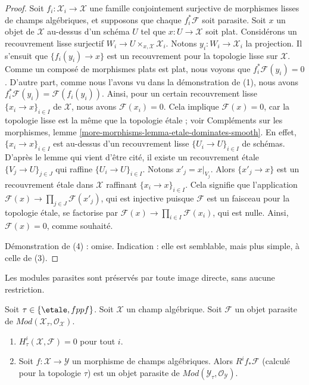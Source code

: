 \begin{proof}
\medskip\noindent
Soit $f_i : \mathcal{X}_i \to \mathcal{X}$ une famille conjointement surjective de
morphismes lisses de champs algébriques, et supposons que chaque $f_i^*\mathcal{F}$
soit parasite. Soit $x$ un objet de $\mathcal{X}$ au-dessus d'un
schéma $U$ tel que $x : U \to \mathcal{X}$ soit plat. Considérons un recouvrement
lisse surjectif $W_i \to U \times_{x, \mathcal{X}} \mathcal{X}_i$.
Notons $y_i : W_i \to \mathcal{X}_i$ la projection. Il s'ensuit
que $\{f_i(y_i) \to x\}$ est un recouvrement pour la topologie lisse
sur $\mathcal{X}$. Comme un composé de morphismes plats est plat, nous voyons que
$f_i^*\mathcal{F}(y_i) = 0$. D'autre part, comme nous l'avons vu dans la démonstration
de (1), nous avons $f_i^*\mathcal{F}(y_i) = \mathcal{F}(f_i(y_i))$.
Ainsi, pour un certain recouvrement lisse $\{x_i \to x\}_{i \in I}$
de $\mathcal{X}$, nous avons $\mathcal{F}(x_i) = 0$. Cela implique
$\mathcal{F}(x) = 0$, car la topologie lisse est la même
que la topologie étale ; voir
Compléments sur les morphismes, lemme \ref{more-morphisms-lemma-etale-dominates-smooth}.
En effet, $\{x_i \to x\}_{i \in I}$ est au-dessus d'un recouvrement lisse
$\{U_i \to U\}_{i \in I}$ de schémas. D'après le lemme qui vient d'être cité,
il existe un recouvrement étale $\{V_j \to U\}_{j \in J}$ qui
raffine $\{U_i \to U\}_{i \in I}$. Notons $x'_j = x|_{V_j}$.
Alors $\{x'_j \to x\}$ est un recouvrement étale dans $\mathcal{X}$
raffinant $\{x_i \to x\}_{i \in I}$. Cela signifie que l'application
$\mathcal{F}(x) \to \prod_{j \in J} \mathcal{F}(x'_j)$, qui est
injective puisque $\mathcal{F}$ est un faisceau pour la topologie étale,
se factorise par $\mathcal{F}(x) \to \prod_{i \in I} \mathcal{F}(x_i)$,
qui est nulle. Ainsi, $\mathcal{F}(x) = 0$, comme souhaité.

\medskip\noindent
Démonstration de (4) : omise. Indication : elle est semblable, mais plus simple, à celle de (3).
\end{proof}

\noindent
Les modules parasites sont préservés par toute image directe, sans aucune restriction.

\begin{lemma}
\label{lemma-pushforward-parasitic}
Soit $\tau \in \{\etale, fppf\}$.
Soit $\mathcal{X}$ un champ algébrique.
Soit $\mathcal{F}$ un objet parasite de
$\textit{Mod}(\mathcal{X}_\tau, \mathcal{O}_\mathcal{X})$.
\begin{enumerate}
\item $H^i_\tau(\mathcal{X}, \mathcal{F}) = 0$ pour tout $i$.
\item Soit $f : \mathcal{X} \to \mathcal{Y}$ un morphisme de champs algébriques.
Alors $R^if_*\mathcal{F}$ (calculé pour la topologie $\tau$) est un
objet parasite de $\textit{Mod}(\mathcal{Y}_\tau, \mathcal{O}_\mathcal{Y})$.
\end{enumerate}
\end{lemma}

